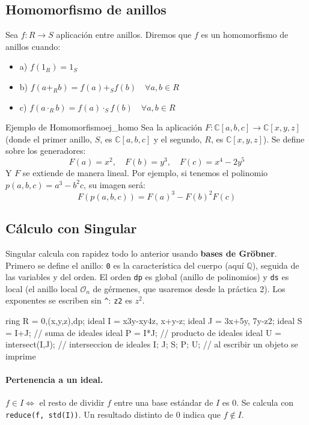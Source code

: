 \documentclass[11pt,a4paper]{article}
\begin{document}
\subsection*{Homomorfismo de anillos}
Sea $f: R \to S$ aplicación entre anillos. Diremos que $f$ es un homomorfismo de anillos cuando:
\begin{itemize}
    \item a) $f(1_R) = 1_S$
    \item b) $f(a+_R b) = f(a) +_S f(b) \quad \forall a,b \in R$
    \item c) $f(a \cdot_R b) = f(a) \cdot_S f(b) \quad \forall a,b \in R$
\end{itemize}

\begin{observacion}{Ejemplo de Homomorfismo}{ej_homo}
Sea la aplicación $F: \mathbb{C}[a,b,c] \to \mathbb{C}[x,y,z]$ (donde el primer anillo, $S$, es $\mathbb{C}[a,b,c]$ y el segundo, $R$, es $\mathbb{C}[x,y,z]$).
Se define sobre los generadores:
$$F(a) = x^2, \quad F(b) = y^3, \quad F(c) = x^4 - 2y^5$$
Y $F$ se extiende de manera lineal. Por ejemplo, si tenemos el polinomio $p(a,b,c) = a^3 - b^2c$, su imagen será:
$$ F(p(a,b,c)) = F(a)^3 - F(b)^2 F(c) $$
\end{observacion}

\subsection*{Cálculo con Singular}

Singular calcula con rapidez todo lo anterior usando \textbf{bases de Gröbner}. Primero se define el anillo: \texttt{0} es la característica del cuerpo (aquí $\mathbb{Q}$), seguida de las variables y del orden. El orden \texttt{dp} es global (anillo de polinomios) y \texttt{ds} es local (el anillo local $\mathcal{O}_n$ de gérmenes, que usaremos desde la práctica 2). Los exponentes se escriben sin \texttt{\^{}}: \texttt{z2} es $z^2$.

\begin{singular}
ring R = 0,(x,y,z),dp;
ideal I = x3y-xy4z, x+y-z;
ideal J = 3x+5y, 7y-z2;
ideal S = I+J;              // suma de ideales
ideal P = I*J;              // producto de ideales
ideal U = intersect(I,J);   // interseccion de ideales
I;  J;  S;  P;  U;          // al escribir un objeto se imprime
\end{singular}

\paragraph{Pertenencia a un ideal.} $f \in I \iff$ el resto de dividir $f$ entre una base estándar de $I$ es $0$. Se calcula con \texttt{reduce(f, std(I))}. Un resultado distinto de $0$ indica que $f \notin I$.
\end{document}
